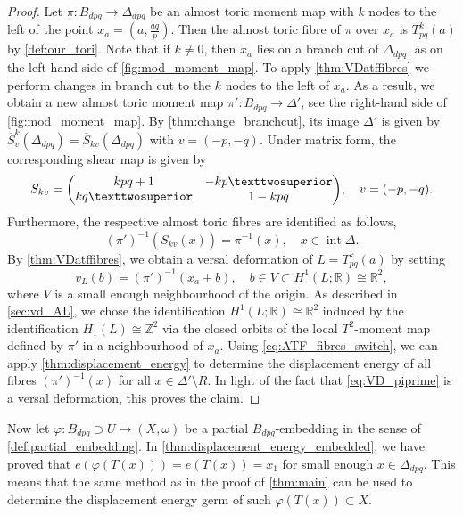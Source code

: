 \documentclass[12pt,a4paper,draft]{scrartcl}
\begin{document}
\begin{proof}
    Let $\pi \colon B_{dpq} \rightarrow \Delta_{dpq}$ be an almost toric moment map with $k$ nodes to the left of the point $x_a =\left( a, \frac{aq}{p}\right)$.
Then the almost toric fibre of $\pi$ over $x_a$ is $T^k_{pq}(a)$ by \cref{def:our_tori}.
Note that if $k \neq 0$, then $x_a$ lies on a branch cut of $\Delta_{dpq}$, as on the left-hand side of \cref{fig:mod_moment_map}.
To apply \cref{thm:VDatffibres} we perform changes in branch cut to the $k$ nodes to the left of $x_a$.
As a result, we obtain a new almost toric moment map $\pi' \colon B_{dpq} \rightarrow \Delta'$, see the right-hand side of \cref{fig:mod_moment_map}.
By \cref{thm:change_branchcut}, its image $\Delta'$ is given by $\overline{S}_v^k (\Delta_{dpq}) = \overline{S}_{kv}(\Delta_{dpq})$ with $v = (-p,-q)$.
Under matrix form, the corresponding shear map is given by 
    \begin{equation}
        S_{kv} = 
        \mqty(kpq+1 & -kp²\\ kq² & 1-kpq), \quad
        v = (-p,-q).
    \end{equation}
    Furthermore, the respective almost toric fibres are identified as follows,
    \begin{equation}
        \label{eq:ATF_fibres_switch}
        (\pi')^{-1}(\overline{S}_{kv}(x)) = \pi^{-1}(x), \quad
        x \in \operatorname{int} \Delta.
    \end{equation}
    By \cref{thm:VDatffibres}, we obtain a versal deformation of $L =T^k_{pq}(a)$ by setting
    \begin{equation}
        \label{eq:VD_piprime}
        v_L(b) = (\pi')^{-1}(x_a + b), \quad
        b \in V \subset H^1(L; \mathbb{R}) \cong \mathbb{R}^2,
    \end{equation}
    where $V$ is a small enough neighbourhood of the origin.
As described in \cref{sec:vd_AL}, we chose the identification $H^1(L; \mathbb{R}) \cong \mathbb{R}^2$ induced by the identification $H_1(L) \cong \mathbb{Z}^2$ via the closed orbits of the local $T^2$-moment map defined by $\pi'$ in a neighbourhood of $x_a$.
Using \eqref{eq:ATF_fibres_switch}, we can apply \cref{thm:displacement_energy} to determine the displacement energy of all fibres $(\pi')^{-1}(x)$ for all $x \in \Delta' \setminus R$.
In light of the fact that \eqref{eq:VD_piprime} is a versal deformation, this proves the claim.
\end{proof}

Now let $\varphi \colon B_{dpq} \supset U \rightarrow (X,\omega)$ be a partial $B_{dpq}$-embedding in the sense of \cref{def:partial_embedding}.
In \cref{thm:displacement_energy_embedded}, we have proved that $e(\varphi(T(x))) = e(T(x)) = x_1$ for small enough $x \in \Delta_{dpq}$.
This means that the same method as in the proof of \cref{thm:main} can be used to determine the displacement energy germ of such $\varphi(T(x)) \subset X$. 
\end{document}
